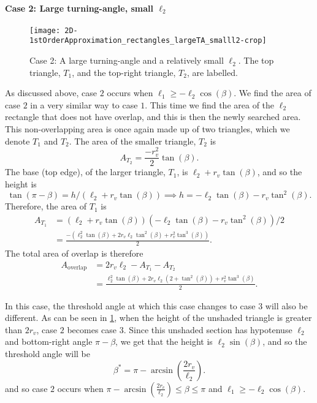 \paragraph{Case 2: Large turning-angle, small $\ell_2$}
\FloatBarrier
\begin{figure}[h!]
	\centering
	\texttt{[image: 2D-1stOrderApproximation\_rectangles\_largeTA\_smalll2-crop]}
	\caption[Case 2: A large turning-angle and a small step]{Case 2: A large turning-angle and a relatively small $\ell_2$. The top triangle, $T_1$, and the top-right triangle, $T_2$, are labelled.}
	\label{fig:2d_model:firstorder:case2}
\end{figure}
As discussed above, case $2$ occurs when $\ell_1 \geq -  \ell_2 \cos (\beta)$. We find the area of case $2$ in a very similar way to case $1$. This time we find the area of the $\ell_2$ rectangle that does not have overlap, and this is then the newly searched area. This non-overlapping area is once again made up of two triangles, which we denote $T_1$ and $T_2$. The area of the smaller triangle, $T_2$ is
\[A_{T_2} = \frac{-r_v^2}{2} \tan(\beta). \]
The base (top edge), of the larger triangle, $T_1$, is $\ell_2 +r_v\tan(\beta)$, and so the height is
\[\tan(\pi-\beta) = h/(\ell_2+r_v\tan(\beta)) \implies h = -\ell_2 \tan(\beta)-r_v \tan^2(\beta). \]
Therefore, the area of $T_1$ is
\begin{align*}
A_{T_1} &=(\ell_2+r_v\tan(\beta))(-\ell_2 \tan(\beta)-r_v\tan^2(\beta))/2\\ 
&= \frac{-\left(\ell_2^2 \tan(\beta) + 2r_v\ell_2 \tan^2(\beta)+ r_v^2\tan^3(\beta)\right)}{2}.
\end{align*}
The total area of overlap is therefore
\begin{align*}
A_{\text{overlap}} &= 2 r_v \ell_2 - A_{T_1} - A_{T_2}\\
&=\frac{\ell_2^2 \tan(\beta) + 2r_v \ell_2(2+\tan^2(\beta))  + r_v^2 \tan^3(\beta)}{2}.
\end{align*}

In this case, the threshold angle at which this case changes to case $3$ will also be different. As can be seen in \cref{fig:2d_model:firstorder:case2}, when the height of the unshaded triangle is greater than $2r_v$, case $2$ becomes case $3$. Since this unshaded section has hypotenuse $\ell_2$ and bottom-right angle $\pi-\beta$, we get that the height is $\ell_2 \sin(\beta)$, and so the threshold angle will be
\[\beta^* = \pi-\arcsin\left(\frac{2r_v}{\ell_2}\right).\]
and so case $2$ occurs when $\pi-\arcsin\left(\frac{2r_v}{\ell_2}\right) \leq \beta \leq \pi$ and $\ell_1 \geq -  \ell_2 \cos (\beta)$.

